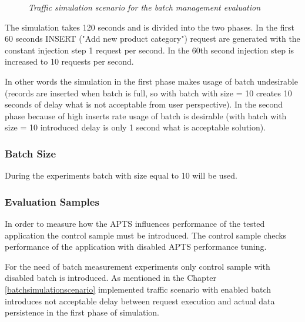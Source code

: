 \documentclass[12pt,a4paper]{article}
\begin{document}
\begin{figure}[!htb]
\caption{\textit{Traffic simulation scenario for the batch management evaluation}} \label{trafficbatch}
\end{figure}

The simulation takes 120 seconds and is divided into the two phases. In the first 60 seconds INSERT ("Add new product category") request are generated with the constant injection step 1 request per second. In the 60th second injection step is increased to 10 requests per second. 

In other words the simulation in the first phase makes usage of batch undesirable (records are inserted when batch is full, so with batch with size = 10 creates 10 seconds of delay what is not acceptable from user perspective). In the second phase because of high inserts rate usage of batch is desirable (with batch with size = 10 introduced delay is only 1 second what is acceptable solution).  
 
\subsubsection{Batch Size} 
During the experiments batch with size equal to 10 will be used. 


\subsubsection{Evaluation Samples} 

In order to measure how the APTS influences performance of the tested application the control sample must be introduced. The control sample checks performance of the application with disabled APTS performance tuning. 

For the need of batch measurement experiments only control sample with disabled batch is introduced. As mentioned in the Chapter \ref{batchsimulationscenario} implemented traffic scenario with enabled batch introduces not acceptable delay between request execution and actual data persistence in the first phase of simulation. 
\end{document}
